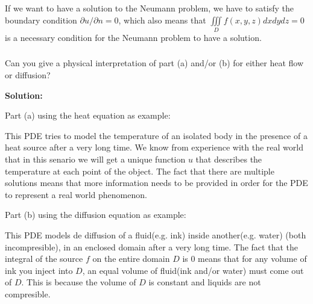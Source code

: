 \documentclass{article}
\begin{document}
			If we want to have a solution to the Neumann problem, we have to satisfy the boundary condition $\partial u /\partial n=0$, which also means that $ \iiint\limits_{D}^{} f(x,y,z)dxdydz=0$ is a necessary condition for the Neumann problem to have a solution.
		\subsubsection{}
	Can you give a physical interpretation of part (a) and/or (b) for either heat flow or diffusion?

	\textbf{Solution:}

Part (a) using the heat equation as example:

This PDE tries to model the temperature of an isolated body in the
presence of a heat source after a very long time. We know from experience with
the real world that in this senario we will get a unique function $u$ that
describes the temperature at each point of the object.
The fact that there are multiple solutions means that more information needs to
be provided in order for the PDE to represent a real world phenomenon.

Part (b) using the diffusion equation as example:

This PDE models de diffusion of a fluid(e.g. ink) inside another(e.g. water)
(both incompresible), in an enclosed domain after a very long time.
The fact that the integral of the source $f$ on the entire domain $D$ is 0
means that for any volume of ink you inject into $D$, an equal volume of
fluid(ink and/or water) must come out of $D$. This is because the volume of $D$
is constant and liquids are not compresible.
\end{document}
